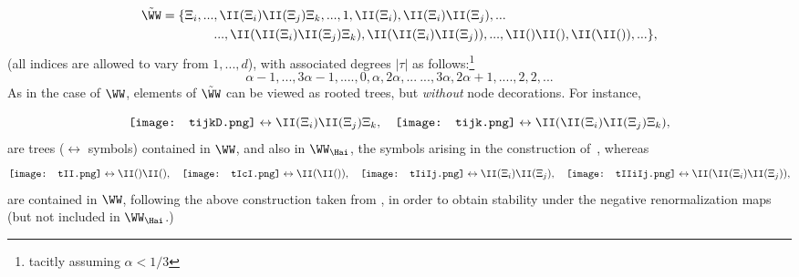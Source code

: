 \documentclass{article}
\begin{document}
\begin{align}
\begin{split}
 \tilde \WW = \{ \Xi_i, ... & , \II(\Xi_i)\II(\Xi_j)\Xi_k,  ... , 1, \II(\Xi_i), \II(\Xi_i) \II(\Xi_j), ...  \label{equ:WWap} \\     
&  ... , \II ( \II(\Xi_i)\II(\Xi_j)  \Xi_k ), \II (  \II(\Xi_i) \II(\Xi_j)),  ... , \II()\II(), \II(\II()),... \},
\end{split}
\end{align}
(all indices are allowed to vary from $1,...,d$), with associated degrees $| \tau |$ as follows:\footnote{tacitly assuming $\alpha < 1/3$} 
$$
                \alpha -1, ..., 3 \alpha -1, .... , 0, \alpha, 2 \alpha, ... \ ...  , 3 \alpha, 2 \alpha +1 , .... , 2, 2, ...
$$
As in the case of $\WW$, elements of $\tilde \WW$  can be viewed as rooted trees, but {\it without} node decorations. For instance,


%
%  
%
%  
%

$$ \texttt{[image: tijkD.png]}  \leftrightarrow  \II(\Xi_i)\II(\Xi_j)\Xi_k, \quad\texttt{[image: tijk.png]}  \leftrightarrow \II ( \II(\Xi_i)\II(\Xi_j)\Xi_k),$$
are trees ($ \leftrightarrow$ symbols) contained in $\WW$, and also in $\WW_{\Hai}$, the symbols arising in the construction of~\cite{Hairer14}, whereas 
$$
\texttt{[image: tII.png]}  \leftrightarrow \II()\II(), \quad  
%
\texttt{[image: tIcI.png]}  \leftrightarrow \II( \II()), \quad  
%
\texttt{[image: tIiIj.png]}  \leftrightarrow \II(\Xi_i)\II(\Xi_j), \quad  
%
\texttt{[image: tIIiIj.png]}  \leftrightarrow \II (  \II(\Xi_i) \II(\Xi_j)), 
$$
are contained in $\WW$, following the above construction taken from \cite{BHZ16}, in order to obtain stability under the negative renormalization maps (but not included in $\WW_{\Hai}$.) 
\end{document}
